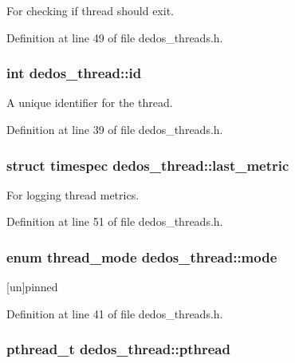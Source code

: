 For checking if thread should exit. 



Definition at line 49 of file dedos\-\_\-threads.\-h.

\hypertarget{structdedos__thread_a9ec2f386c1e31415ee26e54c39f0f02a}{
\subsubsection[{id}]{\setlength{\rightskip}{0pt plus 5cm}int dedos\-\_\-thread\-::id}}\label{structdedos__thread_a9ec2f386c1e31415ee26e54c39f0f02a}


A unique identifier for the thread. 



Definition at line 39 of file dedos\-\_\-threads.\-h.

\hypertarget{structdedos__thread_aa45d04173d89640ec2ddeb95c66db84e}{
\subsubsection[{last\-\_\-metric}]{\setlength{\rightskip}{0pt plus 5cm}struct timespec dedos\-\_\-thread\-::last\-\_\-metric}}\label{structdedos__thread_aa45d04173d89640ec2ddeb95c66db84e}


For logging thread metrics. 



Definition at line 51 of file dedos\-\_\-threads.\-h.

\hypertarget{structdedos__thread_a70d31c1db4f14b59fd88148f5a4d8cbb}{
\subsubsection[{mode}]{\setlength{\rightskip}{0pt plus 5cm}enum {\bf thread\-\_\-mode} dedos\-\_\-thread\-::mode}}\label{structdedos__thread_a70d31c1db4f14b59fd88148f5a4d8cbb}


\mbox{[}un\mbox{]}pinned 



Definition at line 41 of file dedos\-\_\-threads.\-h.

\hypertarget{structdedos__thread_a7a40b7dea35c3ebfb87974126bdd52f8}{
\subsubsection[{pthread}]{\setlength{\rightskip}{0pt plus 5cm}pthread\-\_\-t dedos\-\_\-thread\-::pthread}}\label{structdedos__thread_a7a40b7dea35c3ebfb87974126bdd52f8}



